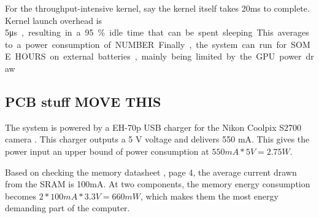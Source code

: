 \documentclass[../main/report.tex]{subfiles}
\begin{document}
For the throughput-intensive kernel, say the kernel itself takes 20ms to complete.
Kernel launch overhead is 5\si\micro s, resulting in a 95 \% idle time that can be spent sleeping.
This averages to a power consumption of NUMBER.


Finally, the system can run for SOME HOURS on external batteries, mainly being limited by the GPU power draw.


\subsection{PCB stuff MOVE THIS}

The system is powered by a EH-70p USB charger for the Nikon Coolpix S2700 camera \cite[p. 196]{usb-charger}.
This charger outputs a 5 V voltage and delivers 550 mA.
This gives the power input an upper bound of power consumption at $550mA * 5V = 2.75W$.

Based on checking the memory datasheet \cite{SRAM-datasheet}, page 4, the average current drawn from the SRAM is 100mA.
At two components, the memory energy consumption becomes $2 * 100mA * 3.3V = 660mW$, which makes them the most energy demanding part of the computer. 
\end{document}
